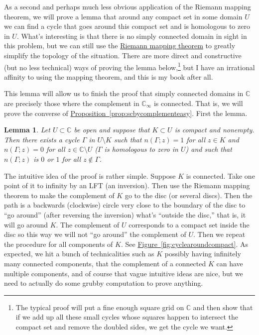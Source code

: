 \documentclass[12pt,openany]{book}
\newcommand{\C}{{\mathbb{C}}}
\newcommand{\myquote}[1]{``#1''}
\theoremstyle{plain}
\newtheorem{lemma}[thm]{Lemma}
\theoremstyle{remark}
\theoremstyle{definition}
\theoremstyle{exercise}
\theoremstyle{example}
\newcommand{\figureref}[1]{\hyperref[#1]{Figure~\ref*{#1}}}
\newcommand{\propref}[1]{\hyperref[#1]{Proposition~\ref*{#1}}}
\begin{document}
As a second and perhaps much less obvious application of the Riemann
mapping theorem,
we will prove a lemma that around any compact set in some domain $U$
we can find a cycle that goes around this compact set and is homologous to
zero in $U$.
What's interesting is that there is no simply connected domain in sight
in this problem, but we can still use the
\hyperref[thm:RMT]{Riemann mapping theorem}
to greatly
simplify the topology of the situation.
There are more direct and
constructive (but no less technical) ways of proving the lemma below,\footnote{%
The typical proof will put a fine enough square grid on $\C$ and then
show that if we add up all these small cycles whose squares happen to intersect
the compact set and remove the doubled sides, we get the cycle we want.}
but I have an irrational affinity to using the mapping theorem, and this is
my book after all.

This lemma will allow us to finish the proof that simply
connected domains in $\C$ are precisely those 
where the complement in $\C_\infty$ is connected.  That is, we will prove
the converse of \propref{prop:scbycomplementeasy}.  First the lemma.

\begin{lemma}\label{lemma:patharoundK}
Let $U \subset \C$ be open and suppose that $K \subset U$ is compact and
nonempty.
Then there exists a cycle
$\Gamma$ in $U \setminus K$ such that $n(\Gamma;z) = 1$ for all $z \in K$ and
$n(\Gamma;z) = 0$ for all $z \in \C \setminus U$ ($\Gamma$ is homologous to
zero in $U$) and such that $n(\Gamma;z)$ is $0$ or $1$ for all $z \notin
\Gamma$.
\end{lemma}

The intuitive idea of the proof is rather simple.  Suppose $K$ is
connected.
Take one point of it to infinity by an LFT
(an inversion).
Then use the Riemann mapping theorem to make the complement of $K$ go to
the disc (or several discs).
Then the path is a backwards (clockwise) circle very close to the boundary of the disc
to \myquote{go around} (after reversing the inversion) what's
\myquote{outside the disc,} that is, it will go around $K$.
The complement of $U$
corresponds to a compact set inside the disc so this way we will not
\myquote{go around} the complement of $U$.
Then we repeat the procedure for all components of $K$.  See
\figureref{fig:cyclearoundcompact}.  As expected,
we hit a bunch of technicalities such as $K$ possibly having
infinitely many connected components, that the complement of a connected
$K$ can have multiple components, and of course that vague intuitive ideas are
nice, but we need to actually do some grubby computation to prove anything.
\end{document}
